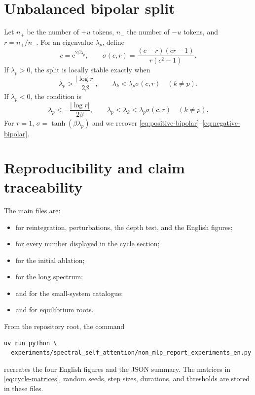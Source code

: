 \documentclass[11pt,a4paper]{article}
\theoremstyle{definition}
\newcommand{\e}{\mathrm e}
\begin{document}
\section{Unbalanced bipolar split}
\label{app:imbalanced}

Let $n_+$ be the number of $+u$ tokens, $n_-$ the number of $-u$ tokens, and
$r=n_+/n_-$. For an eigenvalue $\lambda_p$, define
\[
 c=\e^{2\beta\lambda_p},\qquad
 \sigma(c,r)=\frac{(c-r)(cr-1)}{r(c^2-1)}.
\]
If $\lambda_p>0$, the split is locally stable exactly when
\[
 \lambda_p>\frac{|\log r|}{2\beta},
 \qquad \lambda_k<\lambda_p\sigma(c,r)\quad(k\neq p).
\]
If $\lambda_p<0$, the condition is
\[
 \lambda_p<-\frac{|\log r|}{2\beta},
 \qquad \lambda_p<\lambda_k<\lambda_p\sigma(c,r)\quad(k\neq p).
\]
For $r=1$, $\sigma=\tanh(\beta\lambda_p)$ and we recover
\eqref{eq:positive-bipolar}--\eqref{eq:negative-bipolar}.

\section{Reproducibility and claim traceability}
\label{app:reproducibility}

The main files are:
\begingroup
\small
\raggedright
\begin{itemize}
  \item {}
  for reintegration, perturbations, the depth test, and the English figures;
  \item {}
  for every number displayed in the cycle section;
  \item {}
  for the initial ablation;
  \item {}
  for the long spectrum;
  \item {}
  and  for the small-system catalogue;
  \item {}
  and  for equilibrium roots.
\end{itemize}
\endgroup

From the repository root, the command
\begin{verbatim}
uv run python \
  experiments/spectral_self_attention/non_mlp_report_experiments_en.py
\end{verbatim}
recreates the four English figures and the JSON summary. The matrices in
\eqref{eq:cycle-matrices}, random seeds, step sizes, durations, and thresholds are
stored in these files.
\end{document}
